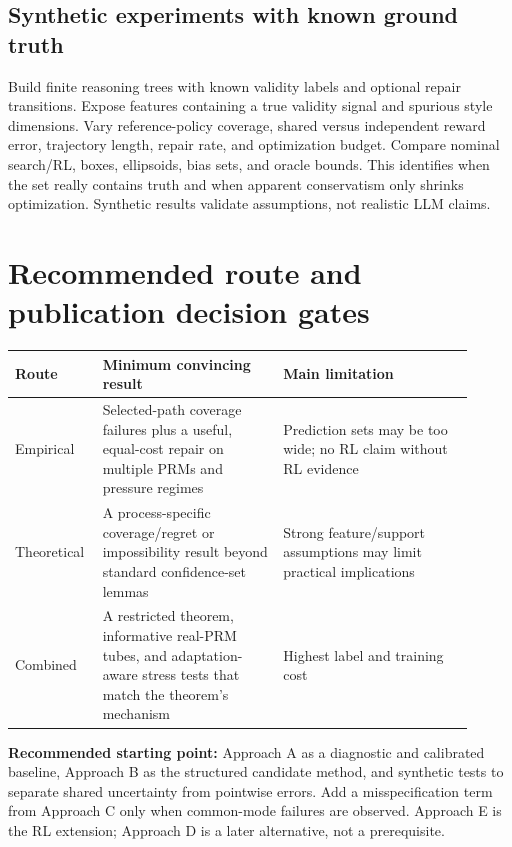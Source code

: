 \subsection{Synthetic experiments with known ground truth}
Build finite reasoning trees with known validity labels and optional repair
transitions. Expose features containing a true validity signal and spurious
style dimensions. Vary reference-policy coverage, shared versus independent
reward error, trajectory length, repair rate, and optimization budget. Compare
nominal search/RL, boxes, ellipsoids, bias sets, and oracle bounds. This identifies
when the set really contains truth and when apparent conservatism only shrinks
optimization. Synthetic results validate assumptions, not realistic LLM claims.

\section{Recommended route and publication decision gates}
\begin{longtable}{p{0.15\linewidth}p{0.37\linewidth}p{0.39\linewidth}}
\toprule Route & Minimum convincing result & Main limitation \\
\midrule\endhead
Empirical & Selected-path coverage failures plus a useful, equal-cost repair on
multiple PRMs and pressure regimes & Prediction sets may be too wide; no RL
claim without RL evidence \\
Theoretical & A process-specific coverage/regret or impossibility result beyond
standard confidence-set lemmas & Strong feature/support assumptions may limit
practical implications \\
Combined & A restricted theorem, informative real-PRM tubes, and adaptation-aware
stress tests that match the theorem's mechanism & Highest label and training cost \\
\bottomrule
\end{longtable}

\textbf{Recommended starting point:} Approach A as a diagnostic and calibrated
baseline, Approach B as the structured candidate method, and synthetic tests to
separate shared uncertainty from pointwise errors. Add a misspecification term
from Approach C only when common-mode failures are observed. Approach E is the
RL extension; Approach D is a later alternative, not a prerequisite.

